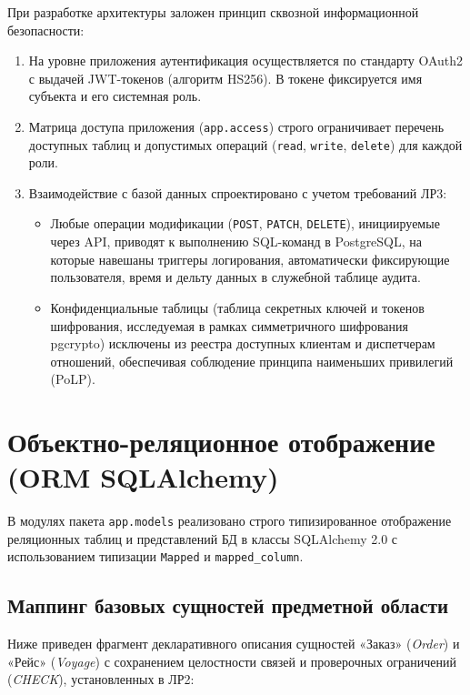 \documentclass[a4paper,14pt]{article}
\begin{document}
При разработке архитектуры заложен принцип сквозной информационной безопасности:
\begin{enumerate}
    \item На уровне приложения аутентификация осуществляется по стандарту OAuth2 с выдачей JWT-токенов (алгоритм HS256). В токене фиксируется имя субъекта и его системная роль.
    \item Матрица доступа приложения (\texttt{app.access}) строго ограничивает перечень доступных таблиц и допустимых операций (\texttt{read}, \texttt{write}, \texttt{delete}) для каждой роли.
    \item Взаимодействие с базой данных спроектировано с учетом требований ЛР3:
          \begin{itemize}
              \item Любые операции модификации (\texttt{POST}, \texttt{PATCH}, \texttt{DELETE}), инициируемые через API, приводят к выполнению SQL-команд в PostgreSQL, на которые навешаны триггеры логирования, автоматически фиксирующие пользователя, время и дельту данных в служебной таблице аудита.
              \item Конфиденциальные таблицы (таблица секретных ключей и токенов шифрования, исследуемая в рамках симметричного шифрования pgcrypto) исключены из реестра доступных клиентам и диспетчерам отношений, обеспечивая соблюдение принципа наименьших привилегий (PoLP).
          \end{itemize}
\end{enumerate}

\newpage
\section{Объектно-реляционное отображение (ORM SQLAlchemy)}

В модулях пакета \texttt{app.models} реализовано строго типизированное отображение реляционных таблиц и представлений БД в классы SQLAlchemy 2.0 с использованием типизации \texttt{Mapped} и \texttt{mapped\_column}.

\subsection{Маппинг базовых сущностей предметной области}
Ниже приведен фрагмент декларативного описания сущностей «Заказ» (\textit{Order}) и «Рейс» (\textit{Voyage}) с сохранением целостности связей и проверочных ограничений (\textit{CHECK}), установленных в ЛР2:
\end{document}
